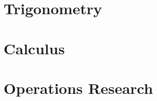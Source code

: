 \documentclass[openany, oneside]{book}
\begin{document}






\part{Trigonometry}







\part{Calculus}

























\part{Operations Research}

\end{document}
